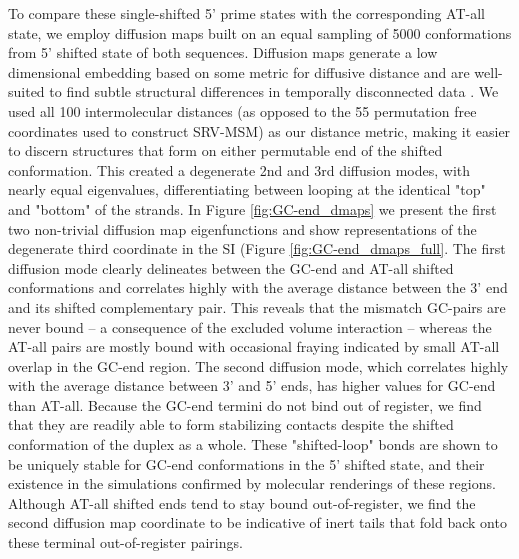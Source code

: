 \documentclass[journal=jpcbfk,manuscript=article]{achemso}
\begin{document}
To compare these single-shifted 5' prime states with the corresponding AT-all state, we employ diffusion maps built on an equal sampling of 5000 conformations from 5' shifted state of both sequences. Diffusion maps generate a low dimensional embedding based on some metric for diffusive distance and are well-suited to find subtle structural differences in temporally disconnected data \citep{Coifman2006DiffusionMaps}. We used all 100 intermolecular distances (as opposed to the 55 permutation free coordinates used to construct SRV-MSM) as our distance metric, making it easier to discern structures that form on either permutable end of the shifted conformation. This created a degenerate 2nd and 3rd diffusion modes, with nearly equal eigenvalues, differentiating between looping at the identical "top" and "bottom" of the strands. In Figure \ref{fig:GC-end_dmaps} we present the first two non-trivial diffusion map eigenfunctions and show representations of the degenerate third coordinate in the SI (Figure \ref{fig:GC-end_dmaps_full}. The first diffusion mode clearly delineates between the GC-end and AT-all shifted conformations and correlates highly with the average distance between the 3' end and its shifted complementary pair. This reveals that the mismatch GC-pairs are never bound -- a consequence of the excluded volume interaction -- whereas the AT-all pairs are mostly bound with occasional fraying indicated by small AT-all overlap in the GC-end region. The second diffusion mode, which correlates highly with the average distance between 3' and 5' ends, has higher values for GC-end than AT-all. Because the GC-end termini do not bind out of register, we find that they are readily able to form stabilizing contacts despite the shifted conformation of the duplex as a whole. These "shifted-loop" bonds are shown to be uniquely stable for GC-end conformations in the 5' shifted state, and their existence in the simulations confirmed by molecular renderings of these regions. Although AT-all shifted ends tend to stay bound out-of-register, we find the second diffusion map coordinate to be indicative of inert tails that fold back onto these terminal out-of-register pairings.
\end{document}
